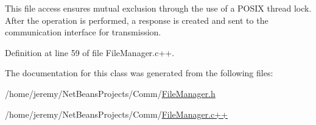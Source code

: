 This file access ensures mutual exclusion through the use of a POSIX thread lock. After the operation is performed, a response is created and sent to the communication interface for transmission. 

Definition at line 59 of file FileManager.c++.



The documentation for this class was generated from the following files:\begin{DoxyCompactItemize}
\item 
/home/jeremy/NetBeansProjects/Comm/\hyperlink{_file_manager_8h}{FileManager.h}\item 
/home/jeremy/NetBeansProjects/Comm/\hyperlink{_file_manager_8c_09_09}{FileManager.c++}\end{DoxyCompactItemize}
